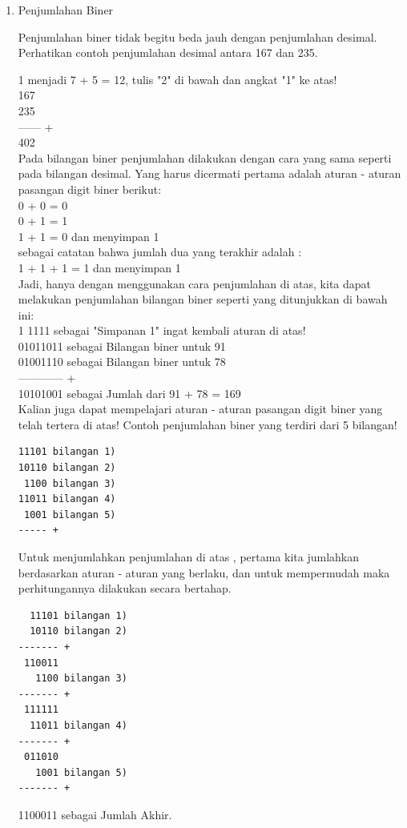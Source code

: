 \begin{enumerate}[label=(\alph*)]
\begin{enumerate}

\item Penjumlahan Biner

\qquad Penjumlahan biner tidak begitu beda jauh dengan penjumlahan desimal. Perhatikan contoh penjumlahan desimal antara 167 dan 235.

1 menjadi 7 + 5 = 12, tulis "2" di bawah dan angkat "1" ke atas! \\

167 \\
235 \\
------ + \\
402 \\

\qquad Pada bilangan biner penjumlahan dilakukan dengan cara yang sama seperti pada bilangan desimal. Yang harus dicermati pertama adalah aturan - aturan pasangan digit biner berikut:\\
0 + 0 = 0 \\
0 + 1 = 1 \\
1 + 1 = 0  dan menyimpan 1 \\

sebagai catatan bahwa jumlah dua yang terakhir adalah : \\
1 + 1 + 1 = 1 dan menyimpan 1 \\

\qquad Jadi, hanya dengan menggunakan cara penjumlahan di atas, kita dapat melakukan penjumlahan bilangan biner seperti yang ditunjukkan di bawah ini: \\
1 1111 sebagai "Simpanan 1" ingat kembali aturan di atas! \\
01011011 sebagai Bilangan biner untuk 91 \\
01001110 sebagai Bilangan biner untuk 78 \\
------------ + \\
10101001 sebagai Jumlah dari 91 + 78 = 169 \\

\qquad Kalian juga dapat mempelajari aturan - aturan pasangan digit biner yang telah tertera di atas! Contoh penjumlahan biner yang terdiri dari 5 bilangan!\\
\begin{verbatim}
11101 bilangan 1)
10110 bilangan 2)
 1100 bilangan 3)
11011 bilangan 4)
 1001 bilangan 5)
----- +
\end{verbatim}

\qquad Untuk menjumlahkan penjumlahan di atas , pertama kita jumlahkan berdasarkan aturan - aturan yang berlaku, dan untuk mempermudah maka perhitungannya dilakukan secara bertahap. \\
\begin{verbatim}
  11101 bilangan 1)
  10110 bilangan 2)
------- +
 110011
   1100 bilangan 3)
------- +
 111111
  11011 bilangan 4)
------- +
 011010
   1001 bilangan 5)
------- +
\end{verbatim}
1100011 sebagai Jumlah Akhir. \\


\end{enumerate}
\end{enumerate}

